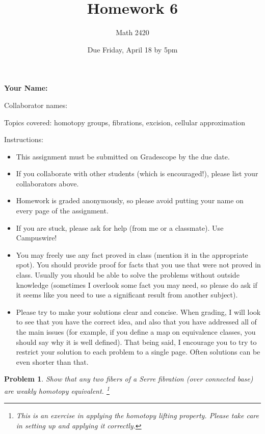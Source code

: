 \documentclass[11pt]{article}
\author{Math 2420}
\date{Due Friday, April 18 by 5pm}
\title{Homework 6}
\newtheorem{problem}{Problem}
\begin{document}
\maketitle

{\bf\Large Your Name:} 

Collaborator names: 


\vspace{.3in}
Topics covered: homotopy groups, fibrations, excision, cellular approximation

Instructions: 
\begin{itemize}
\item This assignment must be submitted on Gradescope by the due date. 
\item If you collaborate with other students (which is encouraged!), please list your collaborators above. 
\item Homework is graded anonymously, so please avoid putting your name on every page of the assignment.
\item If you are stuck, please ask for help (from me or a classmate). Use Campuswire!  
\item You may freely use any fact proved in class (mention it in the appropriate spot). You should provide proof for facts that you use that were not proved in class. Usually you should be able to solve the problems without outside knowledge (sometimes I overlook some fact you may need, so please do ask if it seems like you need to use a significant result from another subject). 
\item Please try to make your solutions clear and concise. When grading, I will look to see that you have the correct idea, and also that you have addressed all of the main issues (for example, if you define a map on equivalence classes, you should say why it is well defined). That being said, I encourage you to try to restrict your solution to each problem to a single page. Often solutions can be even shorter than that. 
\end{itemize}
\pagebreak 



\pagebreak 

\begin{problem}
Show that any two fibers of a Serre fibration (over connected base) are weakly homotopy equivalent. \footnote{This is an exercise in applying the homotopy lifting property. Please take care in setting up and applying it correctly. }
\end{problem}
\end{document}
